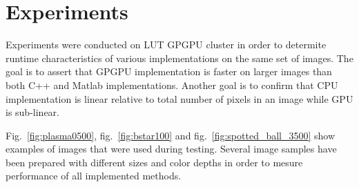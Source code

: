 \documentclass{article}
\begin{document}
\section{Experiments}
Experiments were conducted on LUT GPGPU cluster in order to determite runtime
characteristics of various implementations on the same set of images. The goal is
to assert that GPGPU implementation is faster on larger images than both C++ and
Matlab implementations. Another goal is to confirm that CPU implementation is linear
relative to total number of pixels in an image while GPU is sub-linear.

Fig.~\ref{fig:plasma0500}, fig.~\ref{fig:bstar100} and
fig.~\ref{fig:spotted_ball_3500} show examples of images that were used during testing.
Several image samples have been prepared with different sizes and color depths in
order to mesure performance of all implemented methods.
\end{document}
